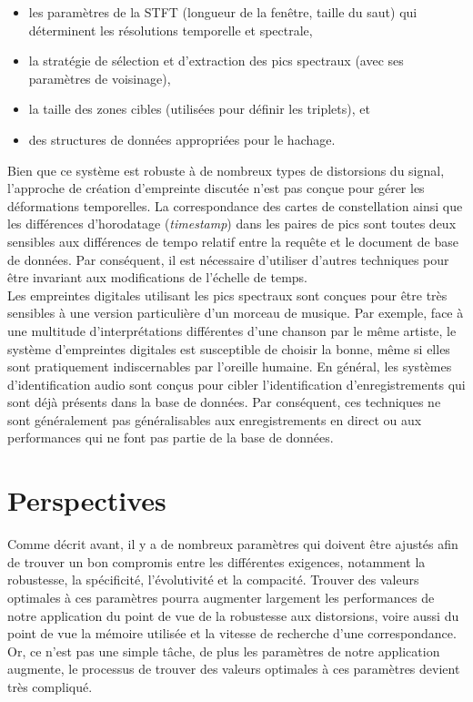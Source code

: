 \documentclass[10pt, report, english]{report}
\begin{document}
 \begin{itemize}
	\item les paramètres de la STFT (longueur de la fenêtre, taille du saut) qui déterminent les résolutions temporelle et spectrale,
	\item la stratégie de sélection et d'extraction des pics spectraux (avec ses paramètres de voisinage),
	\item la taille des zones cibles (utilisées pour définir les triplets), et
	\item des structures de données appropriées pour le hachage.
\end{itemize}

\vspace{0.5cm}
Bien que ce système est robuste à de nombreux types de distorsions du signal, l'approche de création d'empreinte discutée n'est pas conçue pour gérer les déformations temporelles. La correspondance des cartes de constellation ainsi que les différences d'horodatage (\textit{timestamp}) dans les paires de pics sont toutes deux sensibles aux différences de tempo relatif entre la requête et le document de base de données. Par conséquent, il est nécessaire d'utiliser d'autres techniques pour être invariant aux modifications de l'échelle de temps.\\

Les empreintes digitales utilisant les pics spectraux sont conçues pour être très sensibles à une version particulière d'un morceau de musique. Par exemple, face à une multitude d'interprétations différentes d'une chanson par le même artiste, le système d'empreintes digitales est susceptible de choisir la bonne, même si elles sont pratiquement indiscernables par l'oreille humaine. En général, les systèmes d'identification audio sont conçus pour cibler l'identification d'enregistrements qui sont déjà présents dans la base de données. Par conséquent, ces techniques ne sont généralement pas généralisables aux enregistrements en direct ou aux performances qui ne font pas partie de la base de données.


\chapter{Perspectives}
Comme décrit avant, il y a de nombreux paramètres qui doivent être ajustés afin de trouver un bon compromis entre les différentes exigences, notamment la robustesse, la spécificité, l'évolutivité et la compacité. Trouver des valeurs optimales à ces paramètres pourra augmenter largement les performances de notre application du point de vue de la robustesse aux distorsions, voire aussi du point de vue la mémoire utilisée et la vitesse de recherche d'une correspondance. Or, ce n'est pas une simple tâche, de plus les paramètres de notre application augmente, le processus de trouver des valeurs optimales à ces paramètres devient très compliqué.\\
\end{document}
